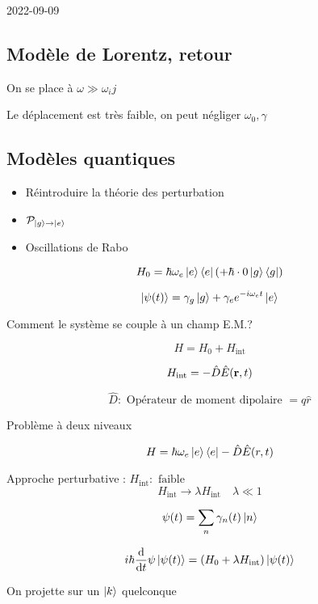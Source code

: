 


2022-09-09

\subsection*{Modèle de Lorentz, retour}


On se place à $\omega \gg \omega_ij$ 

Le déplacement est très faible, on peut négliger $\omega_{0}, \gamma$ 


\setcounter{section}{2}
\setcounter{subsection}{3}

\subsection{Modèles quantiques}

\begin{tcolorbox}[title=Objectifs]
\begin{itemize}
	\item Réintroduire la théorie des perturbation
	\item $\mathcal{P}_{\ket{g}\to \ket{e}}$ 
	\item Oscillations de Rabo
\end{itemize}	 
\end{tcolorbox}


		$$H_0 = \hbar\omega_e \ket{e}\bra{e} \left( + \hbar \cdot 0 \ket{g}\bra{g} \right) $$ 

	$$\ket{\psi(t)} = \gamma_g \ket{g} + \gamma_e e^{-i\omega_e t} \ket{e}$$ 

	Comment le système se couple à un champ E.M.?


$$H = H_0 + H_{\text{int}} $$ 

$$H_{\text{int}} = -\hat D \hat E(\vb{r},t)$$ 

$$\hat D: \text{ Opérateur de moment dipolaire } = q \hat r $$ 

Problème à deux niveaux

$$H = \hbar\omega_e \ket{e}\bra{e} -\hat D \hat E(r,t)$$ 


Approche perturbative : $H_{\text{int}}: \text{ faible }  $ 
$$H_{\text{int}} \to \lambda H_{\text{int}} \quad \lambda \ll 1$$ 


$$\psi(t) = \sum_n \gamma_n (t)\ket{n}$$ 

$$i\hbar \dv{{}}{t} \psi \ket{\psi(t)} = \left( H_0 + \lambda H_{\text{int}}  \right) \ket{\psi(t)}$$ 

On projette sur un $\ket{k}$ quelconque 

